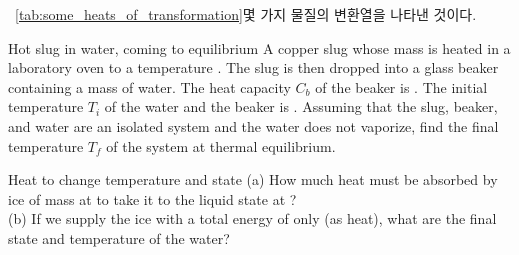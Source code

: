 \someheatsoftransformation
\ \autoref{tab:some_heats_of_transformation}\은 몇 가지 물질의 변환열을
나타낸 것이다. \\\vspace{-12pt}
%
\begin{practicebox}{Hot slug in water, coming to equilibrium}
A copper slug whose mass  is heated in
a laboratory oven to a temperature .
The slug is then dropped into a glass beaker containing a mass
of water. The heat capacity $C_b$ of the beaker is .
The initial temperature $T_i$ of the water and the beaker is
. Assuming that the slug, beaker, and water are
an isolated system and the water does not vaporize,
find the final temperature $T_f$ of the system at thermal equilibrium. \\\vspace{-12pt}%
%
\end{practicebox}
\vspace{4cm}%

\begin{practicebox}{Heat to change temperature and state}
(a) How much heat must be absorbed by ice of mass
 at  to take it
to the liquid state at ? \\
(b) If we supply the ice with a total energy of only 
(as heat), what are the final state and temperature of the water? \\\vspace{-12pt}%
%
\end{practicebox}
\clearpage



